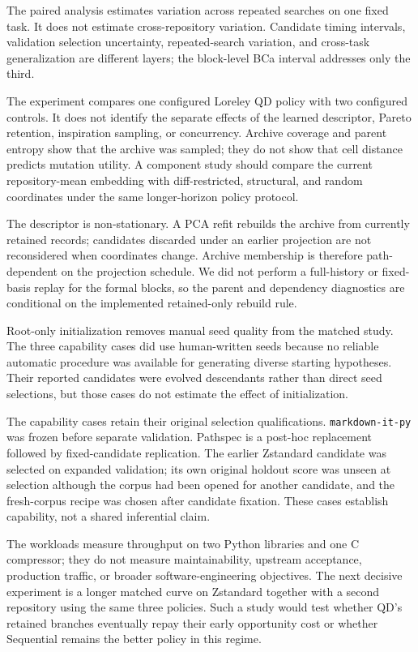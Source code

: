 \documentclass[10pt,twocolumn]{article}
\newcommand{\code}[1]{\texttt{#1}}
\begin{document}
The paired analysis estimates variation across repeated searches on one fixed
task. It does not estimate cross-repository variation. Candidate timing
intervals, validation selection uncertainty, repeated-search variation, and
cross-task generalization are different layers; the block-level BCa interval
addresses only the third.

The experiment compares one configured Loreley QD policy with two configured
controls. It does not identify the separate effects of the learned descriptor,
Pareto retention, inspiration sampling, or concurrency. Archive coverage and
parent entropy show that the archive was sampled; they do not show that cell
distance predicts mutation utility. A component study should compare the
current repository-mean embedding with diff-restricted, structural, and random
coordinates under the same longer-horizon policy protocol.

The descriptor is non-stationary. A PCA refit rebuilds the archive from
currently retained records; candidates discarded under an earlier projection
are not reconsidered when coordinates change. Archive membership is therefore
path-dependent on the projection schedule. We did not perform a full-history
or fixed-basis replay for the formal blocks, so the parent and dependency
diagnostics are conditional on the implemented retained-only rebuild rule.

Root-only initialization removes manual seed quality from the matched study.
The three capability cases did use human-written seeds because no reliable
automatic procedure was available for generating diverse starting hypotheses.
Their reported candidates were evolved descendants rather than direct seed
selections, but those cases do not estimate the effect of initialization.

The capability cases retain their original selection qualifications.
\code{markdown-it-py} was frozen before separate validation. Pathspec is a
post-hoc replacement followed by fixed-candidate replication. The earlier
Zstandard candidate was selected on expanded validation; its own original
holdout score was unseen at selection although the corpus had been opened for
another candidate, and the fresh-corpus recipe was chosen after candidate
fixation. These cases establish capability, not a shared inferential claim.

The workloads measure throughput on two Python libraries and one C compressor;
they do not measure maintainability, upstream acceptance, production traffic,
or broader software-engineering objectives. The next decisive experiment is a
longer matched curve on Zstandard together with a second repository using the
same three policies. Such a study would test whether QD's retained branches
eventually repay their early opportunity cost or whether Sequential remains
the better policy in this regime.
\end{document}
